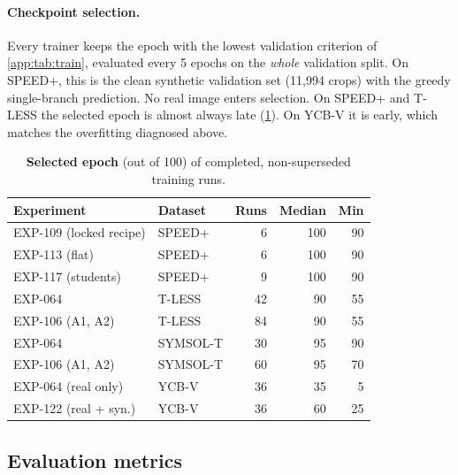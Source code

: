 \paragraph{Checkpoint selection.}
Every trainer keeps the epoch with the lowest validation criterion of \cref{app:tab:train}, evaluated every 5 epochs on the \emph{whole} validation split. On SPEED+, this is the clean synthetic validation set (11{,}994 crops) with the greedy single-branch prediction. No real image enters selection.
On SPEED+ and T-LESS the selected epoch is almost always late (\cref{app:tab:bestep}). On YCB-V it is early, which matches the overfitting diagnosed above.

\begin{table}[t]
  \centering\footnotesize
  \setlength{\tabcolsep}{3pt}
  \begin{tabular}{llrrr}
    \toprule
    Experiment & Dataset & Runs & Median & Min \\
    \midrule
    EXP-109 (locked recipe) & SPEED+   &  6 & 100 & 90 \\
    EXP-113 (flat)          & SPEED+   &  6 & 100 & 90 \\
    EXP-117 (students)      & SPEED+   &  9 & 100 & 90 \\
    EXP-064                 & T-LESS   & 42 & 90 & 55 \\
    EXP-106 (A1, A2)        & T-LESS   & 84 & 90 & 55 \\
    EXP-064                 & SYMSOL-T & 30 & 95 & 90 \\
    EXP-106 (A1, A2)        & SYMSOL-T & 60 & 95 & 70 \\
    EXP-064 (real only)     & YCB-V    & 36 & 35 & 5 \\
    EXP-122 (real + syn.)   & YCB-V    & 36 & 60 & 25 \\
    \bottomrule
  \end{tabular}
  \caption{\textbf{Selected epoch} (out of 100) of completed, non-superseded training runs.}
  \label{app:tab:bestep}
\end{table}

\subsection{Evaluation metrics}\label{app:metrics}

